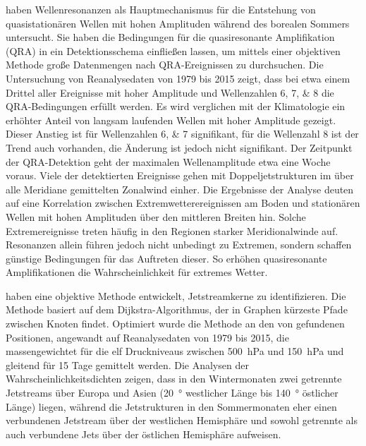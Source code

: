 \citet{kornhuber-2016} haben Wellenresonanzen als Hauptmechanismus für die Entstehung von quasistationären Wellen mit hohen Amplituden während des borealen Sommers untersucht. Sie haben die Bedingungen für die quasiresonante Amplifikation (QRA) in ein Detektionsschema einfließen lassen, um mittels einer objektiven Methode große Datenmengen nach QRA-Ereignissen zu durchsuchen. Die Untersuchung von Reanalysedaten von 1979 bis 2015 zeigt, dass bei etwa einem Drittel aller Ereignisse mit hoher Amplitude und Wellenzahlen \numlist{6; 7; 8} die QRA-Bedingungen erfüllt werden. Es wird verglichen mit der Klimatologie ein erhöhter Anteil von langsam laufenden Wellen mit hoher Amplitude gezeigt. Dieser Anstieg ist für Wellenzahlen \numlist{6; 7} signifikant, für die Wellenzahl \num{8} ist der Trend auch vorhanden, die Änderung ist jedoch nicht signifikant. Der Zeitpunkt der QRA-Detektion geht der maximalen Wellenamplitude etwa eine Woche voraus. Viele der detektierten Ereignisse gehen mit Doppeljetstrukturen im über alle Meridiane gemittelten Zonalwind einher. Die Ergebnisse der Analyse deuten auf eine Korrelation zwischen Extremwetterereignissen am Boden und stationären Wellen mit hohen Amplituden über den mittleren Breiten hin. Solche Extremereignisse treten häufig in den Regionen starker Meridionalwinde auf. Resonanzen allein führen jedoch nicht unbedingt zu Extremen, sondern schaffen günstige Bedingungen für das Auftreten dieser. So erhöhen quasiresonante Amplifikationen die Wahrscheinlichkeit für extremes Wetter.

\citet{molnos-2017} haben eine objektive Methode entwickelt, Jetstreamkerne zu identifizieren. Die Methode basiert auf dem Dijkstra-Algorithmus, der in Graphen kürzeste Pfade zwischen Knoten findet. Optimiert wurde die Methode an den von \citet{rikus-2015} gefundenen Positionen, angewandt auf Reanalysedaten von \num{1979} bis \num{2015}, die massengewichtet für die elf Druckniveaus zwischen \SI{500}{\hecto\pascal} und \SI{150}{\hecto\pascal} und gleitend für \num{15} Tage gemittelt werden. Die Analysen der Wahrscheinlichkeitsdichten zeigen, dass in den Wintermonaten zwei getrennte Jetstreams über Europa und Asien (\SI{20}{\degree} westlicher Länge bis \SI{140}{\degree} östlicher Länge) liegen, während die Jetstrukturen in den Sommermonaten eher einen verbundenen Jetstream über der westlichen Hemisphäre und sowohl getrennte als auch verbundene Jets über der östlichen Hemisphäre aufweisen.
